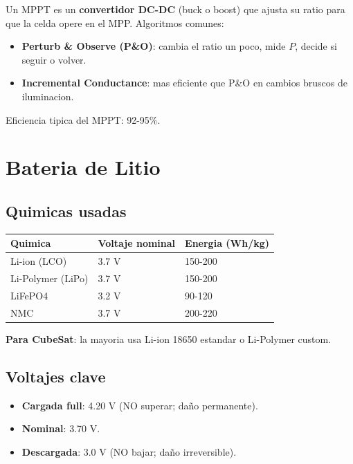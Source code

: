 \documentclass[11pt,a4paper,oneside,openright]{book}
\begin{document}
Un MPPT es un \textbf{convertidor DC-DC} (buck o boost) que ajusta su
ratio para que la celda opere en el MPP. Algoritmos comunes:

\begin{itemize}[leftmargin=2em]
  \item \textbf{Perturb \& Observe (P\&O)}: cambia el ratio un poco, mide
        $P$, decide si seguir o volver.
  \item \textbf{Incremental Conductance}: mas eficiente que P\&O en
        cambios bruscos de iluminacion.
\end{itemize}

Eficiencia tipica del MPPT: 92-95\%.

\chapter{Bateria de Litio}

\section{Quimicas usadas}

\begin{center}
\begin{tabular}{lll}
\toprule
\textbf{Quimica} & \textbf{Voltaje nominal} & \textbf{Energia (Wh/kg)} \\
\midrule
Li-ion (LCO)        & 3.7 V & 150-200 \\
Li-Polymer (LiPo)   & 3.7 V & 150-200 \\
LiFePO4             & 3.2 V & 90-120 \\
NMC                 & 3.7 V & 200-220 \\
\bottomrule
\end{tabular}
\end{center}

\textbf{Para CubeSat}: la mayoria usa Li-ion 18650 estandar o Li-Polymer
custom.

\section{Voltajes clave}

\begin{itemize}[leftmargin=2em]
  \item \textbf{Cargada full}: 4.20 V (NO superar; daño permanente).
  \item \textbf{Nominal}: 3.70 V.
  \item \textbf{Descargada}: 3.0 V (NO bajar; daño irreversible).
\end{itemize}
\end{document}
